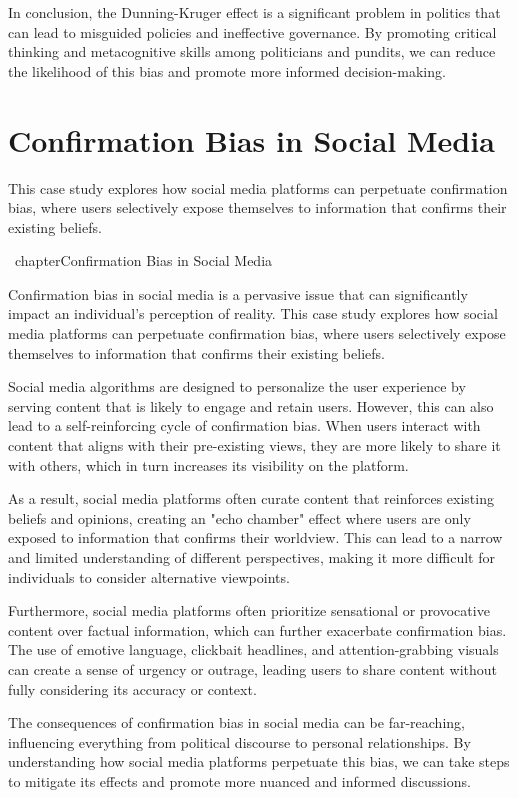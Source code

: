 \documentclass{report}%
\begin{document}
{{{In conclusion, the Dunning-Kruger effect is a significant problem in politics that can lead to misguided policies and ineffective governance. By promoting critical thinking and metacognitive skills among politicians and pundits, we can reduce the likelihood of this bias and promote more informed decision-making.%
\section{Confirmation Bias in Social Media}%
This case study explores how social media platforms can perpetuate confirmation bias, where users selectively expose themselves to information that confirms their existing beliefs.

%
\ chapter{Confirmation Bias in Social Media}

 Confirmation bias in social media is a pervasive issue that can significantly impact an individual's perception of reality. This case study explores how social media platforms can perpetuate confirmation bias, where users selectively expose themselves to information that confirms their existing beliefs.

Social media algorithms are designed to personalize the user experience by serving content that is likely to engage and retain users. However, this can also lead to a self-reinforcing cycle of confirmation bias. When users interact with content that aligns with their pre-existing views, they are more likely to share it with others, which in turn increases its visibility on the platform.

As a result, social media platforms often curate content that reinforces existing beliefs and opinions, creating an "echo chamber" effect where users are only exposed to information that confirms their worldview. This can lead to a narrow and limited understanding of different perspectives, making it more difficult for individuals to consider alternative viewpoints.

Furthermore, social media platforms often prioritize sensational or provocative content over factual information, which can further exacerbate confirmation bias. The use of emotive language, clickbait headlines, and attention-grabbing visuals can create a sense of urgency or outrage, leading users to share content without fully considering its accuracy or context.

The consequences of confirmation bias in social media can be far-reaching, influencing everything from political discourse to personal relationships. By understanding how social media platforms perpetuate this bias, we can take steps to mitigate its effects and promote more nuanced and informed discussions.

}}}
\end{document}
